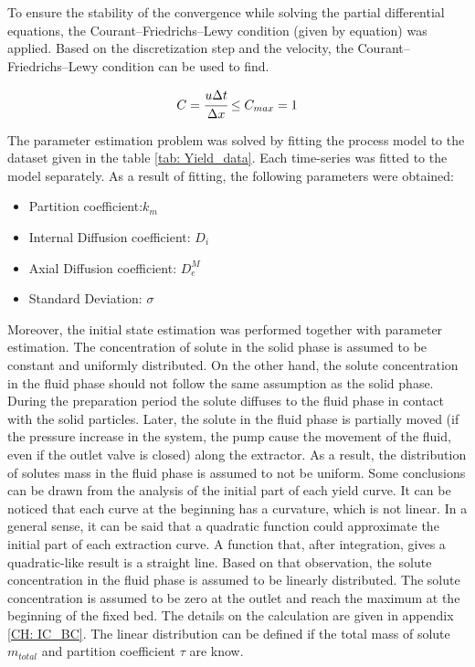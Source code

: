\documentclass[../Article_Model_Parameters.tex]{subfiles}
\begin{document}
	
	\label{CH: Results}
	
	To ensure the stability of the convergence while solving the partial differential equations, the Courant–Friedrichs–Lewy condition (given by equation) was applied. Based on the discretization step and the velocity, the Courant–Friedrichs–Lewy condition can be used to find.
	
	{\footnotesize
		\begin{equation*}
			C = \cfrac{u\Delta t}{\Delta x} \leq C_{max} = 1
		\end{equation*}
	}

    The parameter estimation problem was solved by fitting the process model to the dataset given in the table \ref{tab: Yield_data}. Each time-series was fitted to the model separately. As a result of fitting, the following parameters were obtained:

    \begin{itemize}
        \item Partition coefficient:\qquad\quad\qquad$k_m$
        \item Internal Diffusion coefficient: \quad$D_i$
        \item Axial Diffusion coefficient: \qquad$D_e^M$
        \item Standard Deviation: \qquad\qquad\quad$\sigma$
    \end{itemize}

    Moreover, the initial state estimation was performed together with parameter estimation. The concentration of solute in the solid phase is assumed to be constant and uniformly distributed. On the other hand, the solute concentration in the fluid phase should not follow the same assumption as the solid phase. During the preparation period the solute diffuses to the fluid phase in contact with the solid particles. Later, the solute in the fluid phase is partially moved (if the pressure increase in the system, the pump cause the movement of the fluid, even if the outlet valve is closed) along the extractor. As a result, the distribution of solutes mass in the fluid phase is assumed to not be uniform. Some conclusions can be drawn from the analysis of the initial part of each yield curve. It can be noticed that each curve at the beginning has a curvature, which is not linear. In a general sense, it can be said that a quadratic function could approximate the initial part of each extraction curve. A function that, after integration, gives a quadratic-like result is a straight line. Based on that observation, the solute concentration in the fluid phase is assumed to be linearly distributed. The solute concentration is assumed to be zero at the outlet and reach the maximum at the beginning of the fixed bed. The details on the calculation are given in appendix \ref{CH: IC_BC}. The linear distribution can be defined if the total mass of solute $m_{total}$ and partition coefficient $\tau$ are know.
    
\end{document}
